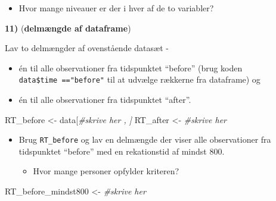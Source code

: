 \documentclass[
]{book}
\newenvironment{Shaded}{\begin{snugshade}}{\end{snugshade}}
\newcommand{\CommentTok}[1]{\textcolor[rgb]{0.56,0.35,0.01}{\textit{#1}}}
\newcommand{\DocumentationTok}[1]{\textcolor[rgb]{0.56,0.35,0.01}{\textbf{\textit{#1}}}}
\newcommand{\FunctionTok}[1]{\textcolor[rgb]{0.00,0.00,0.00}{#1}}
\newcommand{\NormalTok}[1]{#1}
\newcommand{\OtherTok}[1]{\textcolor[rgb]{0.56,0.35,0.01}{#1}}
\newcommand{\SpecialCharTok}[1]{\textcolor[rgb]{0.00,0.00,0.00}{#1}}
\providecommand{\tightlist}{%
  \setlength{\itemsep}{0pt}\setlength{\parskip}{0pt}}
\begin{document}
\begin{Shaded}
\end{Shaded}

\begin{itemize}
\tightlist
\item
  Hvor mange niveauer er der i hver af de to variabler?
\end{itemize}

\textbf{11)} (\textbf{delmængde af dataframe})

Lav to delmængder af ovenstående datasæt -

\begin{itemize}
\tightlist
\item
  én til alle observationer fra tidspunktet ``before'' (brug koden \texttt{data\$time\ =="before"} til at udvælge rækkerne fra dataframe) og
\item
  én til alle observationer fra tidspunktet ``after''.
\end{itemize}

\begin{Shaded}
\begin{Highlighting}[]
\NormalTok{RT\_before }\OtherTok{\textless{}{-}}\NormalTok{ data[}\CommentTok{\#skrive her , ]}
\NormalTok{RT\_after }\OtherTok{\textless{}{-}} \CommentTok{\#skrive her}
\end{Highlighting}
\end{Shaded}

\begin{itemize}
\tightlist
\item
  Brug \texttt{RT\_before} og lav en delmængde der viser alle observationer fra tidspunktet ``before'' med en rekationstid af mindst 800.

  \begin{itemize}
  \tightlist
  \item
    Hvor mange personer opfylder kriteren?
  \end{itemize}
\end{itemize}

\begin{Shaded}
\begin{Highlighting}[]
\NormalTok{RT\_before\_mindst800 }\OtherTok{\textless{}{-}} \CommentTok{\#skrive her}
\end{Highlighting}
\end{Shaded}
\end{document}
